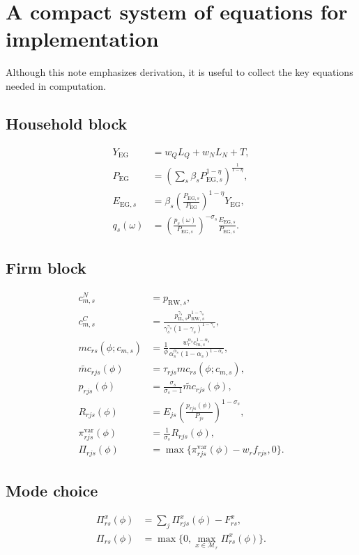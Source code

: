 \documentclass[11pt]{article}
\begin{document}
\section{A compact system of equations for implementation}

Although this note emphasizes derivation, it is useful to collect the key equations needed in computation.

\subsection*{Household block}
\begin{align}
Y_{\mathrm{EG}} &= w_QL_Q+w_NL_N+T,\\
P_{\mathrm{EG}} &= \left(\sum_s \beta_s P_{\mathrm{EG},s}^{1-\eta}\right)^{\frac{1}{1-\eta}},\\
E_{\mathrm{EG},s} &= \beta_s\left(\frac{P_{\mathrm{EG},s}}{P_{\mathrm{EG}}}\right)^{1-\eta}Y_{\mathrm{EG}},\\
q_s(\omega) &= \left(\frac{p_s(\omega)}{P_{\mathrm{EG},s}}\right)^{-\sigma_s}\frac{E_{\mathrm{EG},s}}{P_{\mathrm{EG},s}}.
\end{align}

\subsection*{Firm block}
\begin{align}
c^N_{m,s} &= p_{\mathrm{RW},s},\\
c^C_{m,s} &= \frac{p_{\mathrm{IL},s}^{\gamma_s}p_{\mathrm{RW},s}^{1-\gamma_s}}{\gamma_s^{\gamma_s}(1-\gamma_s)^{1-\gamma_s}},\\
mc_{rs}(\phi;c_{m,s}) &= \frac{1}{\phi}\frac{w_r^{\alpha_s}c_{m,s}^{1-\alpha_s}}{\alpha_s^{\alpha_s}(1-\alpha_s)^{1-\alpha_s}},\\
\widetilde{mc}_{rjs}(\phi) &= \tau_{rjs}mc_{rs}(\phi;c_{m,s}),\\
p_{rjs}(\phi) &= \frac{\sigma_s}{\sigma_s-1}\widetilde{mc}_{rjs}(\phi),\\
R_{rjs}(\phi) &= E_{js}\left(\frac{p_{rjs}(\phi)}{P_{js}}\right)^{1-\sigma_s},\\
\pi^{\mathrm{var}}_{rjs}(\phi) &= \frac{1}{\sigma_s}R_{rjs}(\phi),\\
\Pi_{rjs}(\phi) &= \max\{\pi^{\mathrm{var}}_{rjs}(\phi)-w_rf_{rjs},0\}.
\end{align}

\subsection*{Mode choice}
\begin{align}
\Pi^x_{rs}(\phi)&=\sum_j \Pi^x_{rjs}(\phi)-F^x_{rs},\\
\Pi_{rs}(\phi)&=\max\{0,\max_{x\in\mathcal{M}_r}\Pi^x_{rs}(\phi)\}.
\end{align}
\end{document}
